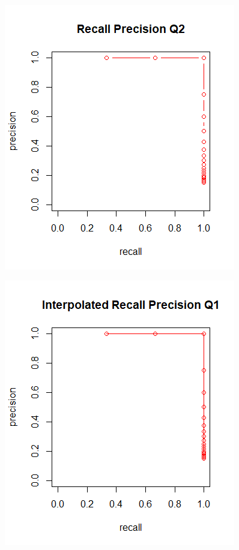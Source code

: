 \documentclass[letterpaper,12pt]{article}
\begin{document}
\begin{figure}
  \includegraphics[width=\linewidth]{84q2uninterpolated.PNG}
  \label{fig:q2uninterpolated}
\end{figure}

\begin{figure}
  \includegraphics[width=\linewidth]{84q2interpolated.PNG}
  \label{fig:q2interpolated}
\end{figure}
\end{document}
